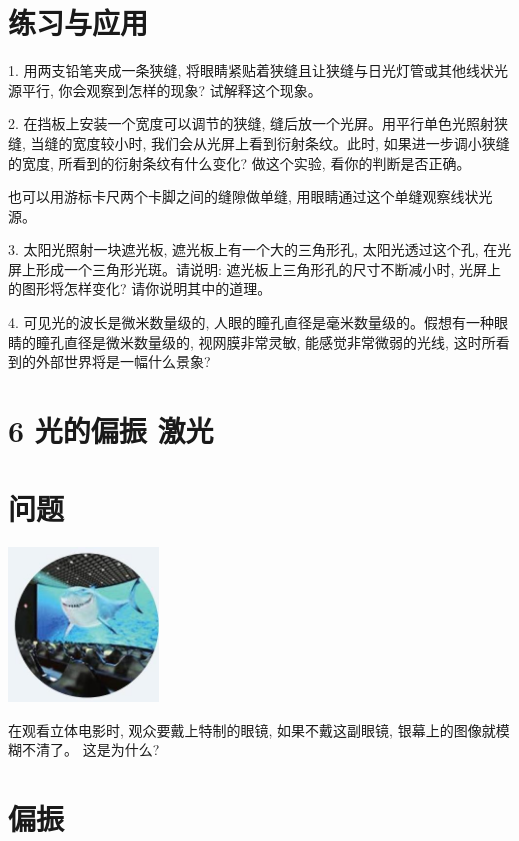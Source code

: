 \documentclass[10pt]{article}
\begin{document}
\section*{练习与应用}

1. 用两支铅笔夹成一条狭缝, 将眼睛紧贴着狭缝且让狭缝与日光灯管或其他线状光源平行, 你会观察到怎样的现象? 试解释这个现象。

2. 在挡板上安装一个宽度可以调节的狭缝, 缝后放一个光屏。用平行单色光照射狭缝, 当缝的宽度较小时, 我们会从光屏上看到衍射条纹。此时, 如果进一步调小狭缝的宽度, 所看到的衍射条纹有什么变化? 做这个实验, 看你的判断是否正确。

也可以用游标卡尺两个卡脚之间的缝隙做单缝, 用眼睛通过这个单缝观察线状光源。

3. 太阳光照射一块遮光板, 遮光板上有一个大的三角形孔, 太阳光透过这个孔, 在光屏上形成一个三角形光斑。请说明: 遮光板上三角形孔的尺寸不断减小时, 光屏上的图形将怎样变化? 请你说明其中的道理。

4. 可见光的波长是微米数量级的, 人眼的瞳孔直径是毫米数量级的。假想有一种眼睛的瞳孔直径是微米数量级的, 视网膜非常灵敏, 能感觉非常微弱的光线, 这时所看到的外部世界将是一幅什么景象?

\section*{6 光的偏振 激光}

\section*{问题}

\begin{center}
\includegraphics[max width=0.3\textwidth]{images/01910e4c-ebb8-7d2c-8f2f-2375bc1d2d12_113_406212.jpg}
\end{center}

在观看立体电影时, 观众要戴上特制的眼镜, 如果不戴这副眼镜, 银幕上的图像就模糊不清了。 这是为什么?

\section*{偏振}
\end{document}
